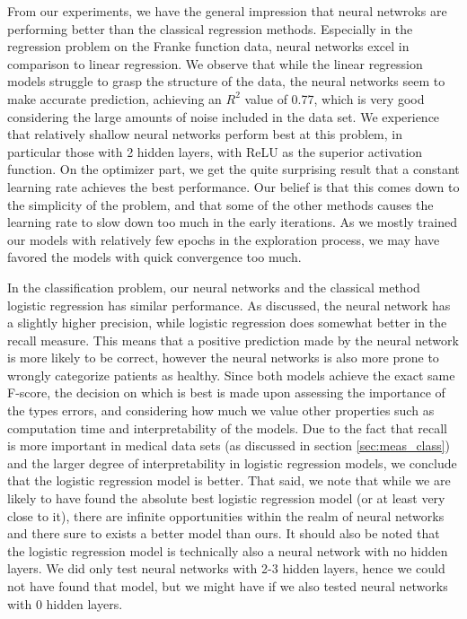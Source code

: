 From our experiments, we have the general impression that neural netwroks are performing better than the classical regression methods.
Especially in the regression problem on the Franke function data, neural networks excel in comparison to linear regression.
We observe that while the linear regression models struggle to grasp the structure of the data, the neural networks seem to make accurate prediction, achieving an $R^2$ value of 0.77, which is very good considering the large amounts of noise included in the data set.
We experience that relatively shallow neural networks perform best at this problem, in particular those with 2 hidden layers, with ReLU as the superior activation function.
On the optimizer part, we get the quite surprising result that a constant learning rate achieves the best performance.
Our belief is that this comes down to the simplicity of the problem, and that some of the other methods causes the learning rate to slow down too much in the early iterations.
As we mostly trained our models with relatively few epochs in the exploration process, we may have favored the models with quick convergence too much.

In the classification problem, our neural networks and the classical method logistic regression has similar performance.
As discussed, the neural network has a slightly higher precision, while logistic regression does somewhat better in the recall measure.
This means that a positive prediction made by the neural network is more likely to be correct, however the neural networks is also more prone to wrongly categorize patients as healthy.
Since both models achieve the exact same F-score, the decision on which is best is made upon assessing the importance of the types errors, and considering how much we value other properties such as computation time and interpretability of the models.
Due to the fact that recall is more important in medical data sets (as discussed in section \ref{sec:meas_class}) and the larger degree of interpretability in logistic regression models, we conclude that the logistic regression model is better.
That said, we note that while we are likely to have found the absolute best logistic regression model (or at least very close to it), there are infinite opportunities within the realm of neural networks and there sure to exists a better model than ours.
It should also be noted that the logistic regression model is technically also a neural network with no hidden layers.
We did only test neural networks with 2-3 hidden layers, hence we could not have found that model, but we might have if we also tested neural networks with 0 hidden layers.

